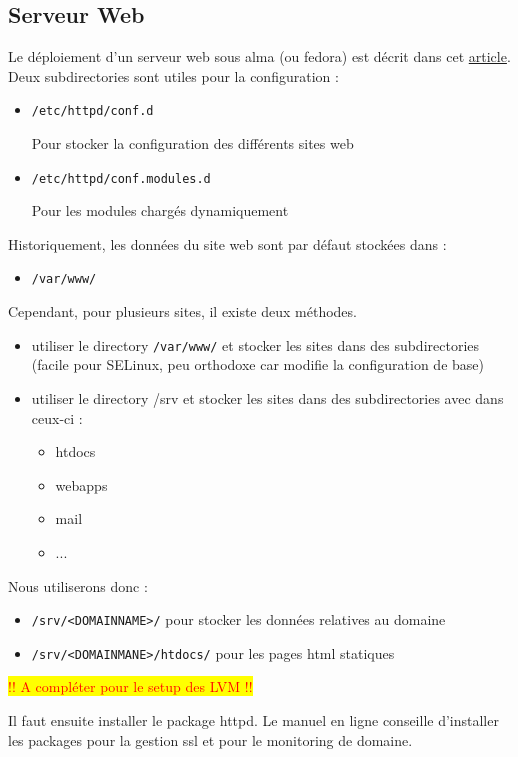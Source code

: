 \documentclass{article}
\begin{document}
	
	\subsection{Serveur Web}
	Le déploiement d'un serveur web sous alma (ou fedora) est décrit dans cet \href{https://docs.fedoraproject.org/en-US/fedora-server/services/httpd-basic-setup/}{article}.
	Deux subdirectories sont utiles pour la configuration :
	\begin{itemize}
		\item \texttt{/etc/httpd/conf.d}
		
		Pour stocker la configuration des différents sites web
		\item \texttt{/etc/httpd/conf.modules.d}
		
		Pour les modules chargés dynamiquement
	\end{itemize}
	Historiquement, les données du site web sont par défaut stockées dans :
	\begin{itemize}
		\item \texttt{/var/www/}
	\end{itemize}
	Cependant, pour plusieurs sites, il existe deux méthodes.
	\begin{itemize}
		\item utiliser  le directory \texttt{/var/www/} et stocker les sites dans des subdirectories (facile pour SELinux, peu orthodoxe car modifie la configuration de base)
		\item utiliser le directory /srv et stocker les sites dans des subdirectories avec dans ceux-ci :
		\begin{itemize}
			 \item htdocs
			 \item webapps
			 \item mail
			 \item ...
		\end{itemize}
	\end{itemize}
	Nous utiliserons donc :
	\begin{itemize}
		\item \texttt{/srv/<DOMAINNAME>/} pour stocker les données relatives au domaine
		\item  \texttt{/srv/<DOMAINMANE>/htdocs/} pour les pages html statiques
	\end{itemize}
	\colorbox{yellow}{\textcolor{red}{!! A compléter pour le setup des LVM !!}}
	
	
	Il faut  ensuite installer le package httpd. Le manuel en ligne conseille d'installer les packages pour la gestion ssl et pour le monitoring de domaine.
	
\end{document}
